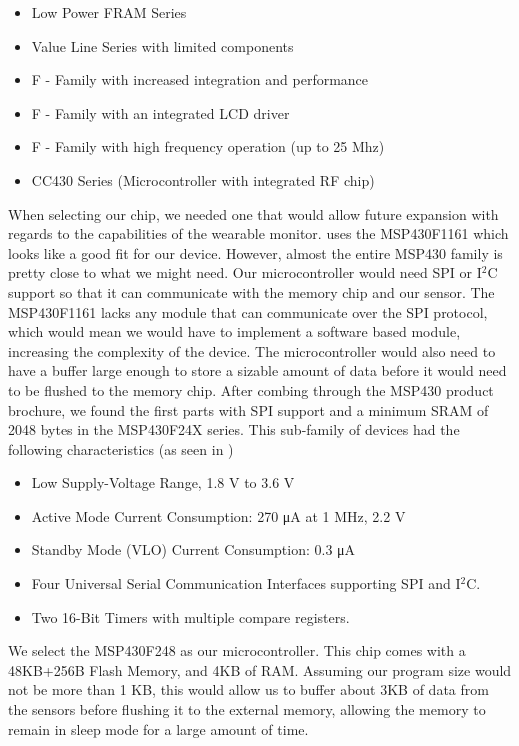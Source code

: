\begin{itemize}
  \item Low Power FRAM Series
  \item Value Line Series with limited components
  \item F - Family with increased integration and performance
  \item F - Family with an integrated LCD driver
  \item F - Family with high frequency operation (up to 25 Mhz)
  \item CC430 Series (Microcontroller with integrated RF chip)
\end{itemize}

When selecting our chip,
we needed one that would allow future expansion with regards to the capabilities of the wearable monitor.
\cite{Web:ShimmerHome} uses the MSP430F1161 which looks like a good fit for our device. 
However, almost the entire MSP430 family is pretty close to what we might need.
Our microcontroller would need SPI or I$^2$C support so that it can communicate with the memory chip and our sensor.
The MSP430F1161 lacks any module that can communicate over the SPI protocol,
which would mean we would have to implement a software based module,
increasing the complexity of the device.
The microcontroller would also need to have a buffer large enough to store
a sizable amount of data before it would need to be flushed to the memory chip.
After combing through the MSP430 product brochure, we found the first parts with SPI support and
a minimum SRAM of 2048 bytes in the MSP430F24X series. This sub-family of devices had
the following characteristics (as seen in \cite{msp430F24xfamily})

\begin{itemize}
	\item Low Supply-Voltage Range, 1.8 V to 3.6 V
	\item Active Mode Current Consumption: 270 μA at 1 MHz, 2.2 V
	\item Standby Mode (VLO) Current Consumption: 0.3 μA
	\item Four Universal Serial Communication Interfaces supporting SPI and I$^2$C.
	\item Two 16-Bit Timers with multiple compare registers.
\end{itemize}
We select the MSP430F248 as our microcontroller. This chip comes with a 48KB+256B Flash Memory, and 4KB of RAM. Assuming our program size would not be more than 1 KB, this would allow us to buffer about 3KB of data from the sensors before flushing it to the external memory, allowing the memory to remain in sleep mode for a large amount of time.

